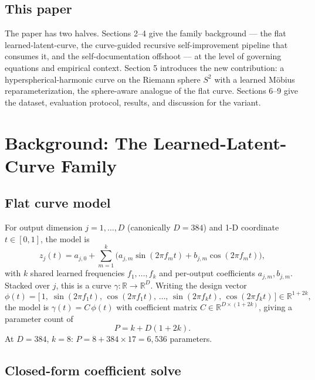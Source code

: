 \documentclass[11pt,a4paper]{article}
\begin{document}
\subsection{This paper}

The paper has two halves. Sections 2--4 give the family background --- the flat learned-latent-curve, the curve-guided recursive self-improvement pipeline that consumes it, and the self-documentation offshoot --- at the level of governing equations and empirical context. Section 5 introduces the new contribution: a hyperspherical-harmonic curve on the Riemann sphere $S^2$ with a learned Möbius reparameterization, the sphere-aware analogue of the flat curve. Sections 6--9 give the dataset, evaluation protocol, results, and discussion for the variant.


\section{Background: The Learned-Latent-Curve Family}
\label{sec:family}

\subsection{Flat curve model}

For output dimension $j = 1, \dots, D$ (canonically $D = 384$) and 1-D coordinate $t \in [0, 1]$, the model is
\begin{equation}
z_j(t) = a_{j,0} + \sum_{m=1}^{k} \big( a_{j,m} \sin(2\pi f_m t) + b_{j,m} \cos(2\pi f_m t) \big),
\label{eq:flat}
\end{equation}
with $k$ shared learned frequencies $f_1, \dots, f_k$ and per-output coefficients $a_{j,m}, b_{j,m}$. Stacked over $j$, this is a curve $\gamma : \mathbb{R} \to \mathbb{R}^D$. Writing the design vector
\begin{equation}
\phi(t) = \big[\, 1,\; \sin(2\pi f_1 t),\, \cos(2\pi f_1 t),\, \dots,\, \sin(2\pi f_k t),\, \cos(2\pi f_k t) \,\big] \in \mathbb{R}^{1+2k},
\label{eq:design}
\end{equation}
the model is $\gamma(t) = C\, \phi(t)$ with coefficient matrix $C \in \mathbb{R}^{D \times (1+2k)}$, giving a parameter count of
\begin{equation}
P = k + D(1 + 2k).
\label{eq:paramcount}
\end{equation}
At $D = 384$, $k = 8$: $P = 8 + 384 \times 17 = 6{,}536$ parameters.

\subsection{Closed-form coefficient solve}
\end{document}

